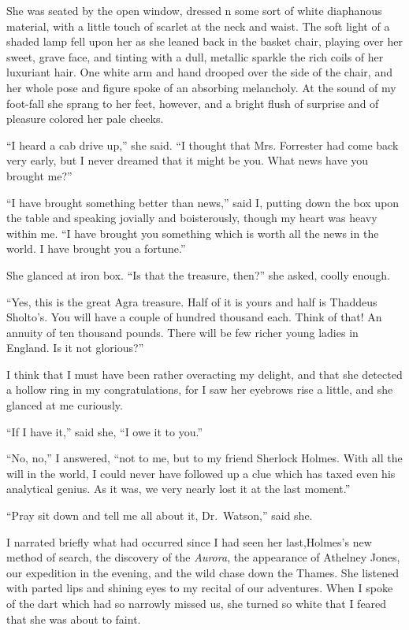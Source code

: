\documentclass[12pt,english,oneside]{book}
\begin{document}
She was seated by the open window, dressed n some sort of white diaphanous
material, with a little touch of scarlet at the neck and waist. The
soft light of a shaded lamp fell upon her as she leaned back in the
basket chair, playing over her sweet, grave face, and tinting with
a dull, metallic sparkle the rich coils of her luxuriant hair. One
white arm and hand drooped over the side of the chair, and her whole
pose and figure spoke of an absorbing melancholy. At the sound of
my foot-fall she sprang to her feet, however, and a bright flush of
surprise and of pleasure colored her pale cheeks.

{}``I heard a cab drive up,'' she said. {}``I thought that Mrs.
Forrester had come back very early, but I never dreamed that it might
be you. What news have you brought me?''

{}``I have brought something better than news,'' said I, putting
down the box upon the table and speaking jovially and boisterously,
though my heart was heavy within me. {}``I have brought you something
which is worth all the news in the world. I have brought you a fortune.''

She glanced at iron box. {}``Is that the treasure, then?'' she asked,
coolly enough.

{}``Yes, this is the great Agra treasure. Half of it is yours and
half is Thaddeus Sholto's. You will have a couple of hundred thousand
each. Think of that! An annuity of ten thousand pounds. There will
be few richer young ladies in England. Is it not glorious?''

I think that I must have been rather overacting my delight, and that
she detected a hollow ring in my congratulations, for I saw her eyebrows
rise a little, and she glanced at me curiously.

{}``If I have it,'' said she, {}``I owe it to you.''

{}``No, no,'' I answered, {}``not to me, but to my friend Sherlock
Holmes. With all the will in the world, I could never have followed
up a clue which has taxed even his analytical genius. As it was, we
very nearly lost it at the last moment.''

{}``Pray sit down and tell me all about it, Dr.\ Watson,'' said
she.

I narrated briefly what had occurred since I had seen her last,\mdsh{---}Holmes's
new method of search, the discovery of the \emph{Aurora}, the appearance
of Athelney Jones, our expedition in the evening, and the wild chase
down the Thames. She listened with parted lips and shining eyes to
my recital of our adventures. When I spoke of the dart which had so
narrowly missed us, she turned so white that I feared that she was
about to faint.
\end{document}
